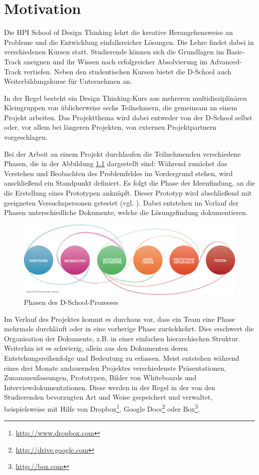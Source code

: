 \chapter{Motivation}
\label{chap:Einleitung}
Die HPI School of Design Thinking lehrt die kreative Herangehensweise an Probleme und die Entwicklung einfallsreicher Lösungen. Die Lehre findet dabei in verschiedenen Kursen statt. Studierende können sich die Grundlagen im \gls{Basic-Track} aneignen und ihr Wissen nach erfolgreicher Absolvierung im  \gls{Advanced-Track} vertiefen. Neben den studentischen Kursen bietet die D-School auch Weiterbildungskurse für Unternehmen an.

In der Regel besteht ein Design Thinking-Kurs aus mehreren multidisziplinären Kleingruppen von üblicherweise sechs Teilnehmern, die gemeinsam an einem Projekt arbeiten. Das Projektthema wird dabei entweder von der D-School selbst oder, vor allem bei längeren Projekten, von externen Projektpartnern vorgeschlagen. 

Bei der Arbeit an einem Projekt durchlaufen die Teilnehmenden verschiedene Phasen, die in der Abbildung \ref{fig:dschool-prozess} dargestellt sind: Während zunächst das Verstehen und Beobachten des Problemfeldes im Vordergrund stehen, wird anschließend ein Standpunkt definiert. Es folgt die Phase der Ideenfindung, an die die Erstellung eines Prototypen anknüpft. Dieser Prototyp wird abschließend mit geeigneten Versuchspersonen getestet (vgl. \cite{design-thinking}). Dabei entstehen im Verlauf der Phasen unterschiedliche Dokumente, welche die Lösungsfindung dokumentieren.

\begin{figure}[h]  
  \centering     
  \includegraphics[width=1.0\textwidth]{img/dschool_prozess.jpg}  
   \caption{Phasen des D-School-Prozesses\protect\footnotemark}
  \label{fig:dschool-prozess} 
\end{figure}

Im Verlauf des Projektes kommt es durchaus vor, dass ein Team eine Phase mehrmals durchläuft oder in eine vorherige Phase zurückkehrt. Dies erschwert die Organisation der Dokumente, z.B. in einer einfachen hierarchischen Struktur. Weiterhin ist es schwierig, allein aus den Dokumenten deren Entstehungsreihenfolge und Bedeutung zu erfassen. Meist entstehen während eines drei Monate andauernden Projektes verschiedenste Präsentationen, Zusammenfassungen, Prototypen, Bilder von Whiteboards und Interviewdokumentationen. Diese werden in der Regel in der von den Studierenden bevorzugten Art und Weise gespeichert und verwaltet, beispielsweise mit Hilfe von Dropbox\footnote{\url{http://www.dropbox.com}}, Google Docs\footnote{\url{http://drive.google.com}} oder \gls{Box}\footnote{\url{http://box.com}}.

